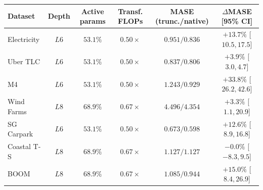 \begin{tabular}{lccccc}
    \toprule
    Dataset & Depth & Active params & Transf. FLOPs & MASE (trunc./native) & $\Delta$MASE [95\% CI] \\
    \midrule
    Electricity & \(L6\) & \(53.1\%\) & \(0.50\times\) & \(0.951 / 0.836\) & \(+13.7\%\) [\(10.5,17.5\)] \\
    Uber TLC & \(L6\) & \(53.1\%\) & \(0.50\times\) & \(0.837 / 0.806\) & \(+3.9\%\) [\(3.0,4.7\)] \\
    M4 & \(L6\) & \(53.1\%\) & \(0.50\times\) & \(1.243 / 0.929\) & \(+33.8\%\) [\(26.2,42.6\)] \\
    Wind Farms & \(L8\) & \(68.9\%\) & \(0.67\times\) & \(4.496 / 4.354\) & \(+3.3\%\) [\(1.1,20.9\)] \\
    \midrule
    SG Carpark & \(L6\) & \(53.1\%\) & \(0.50\times\) & \(0.673 / 0.598\) & \(+12.6\%\) [\(8.9,16.8\)] \\
    Coastal T-S & \(L8\) & \(68.9\%\) & \(0.67\times\) & \(1.127 / 1.127\) & \(-0.0\%\) [\(-8.3,9.5\)] \\
    BOOM & \(L8\) & \(68.9\%\) & \(0.67\times\) & \(1.085 / 0.944\) & \(+15.0\%\) [\(8.4,26.9\)] \\
    \bottomrule
\end{tabular}
